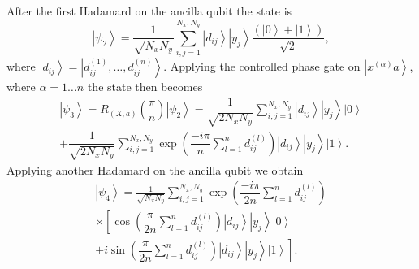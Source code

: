 \documentclass[pra,showkeys,twocolumn,showpacs,aps,10pt]{revtex4-1}
\begin{document}
After the first Hadamard on the ancilla qubit the state is
%
\begin{equation}
    \left| \psi_2 \right\rangle =
    \frac{1}{\sqrt{N_x N_y}}\sum\limits_{i, j=1}^{N_x,N_y}
    \left| d_{ij} \right\rangle
    \left| y_j \right\rangle
    \dfrac{(\left| 0 \right\rangle + \left| 1 \right\rangle)}{\sqrt{2}},
\end{equation}
%
where $\left| d_{ij} \right\rangle = \left| d_{ij}^{(1)},\ldots,d_{ij}^{(n)} \right\rangle$.
Applying the controlled phase gate on $\left| x^{(\alpha)} a \right\rangle$, where $\alpha = 1\dots n$  the state then becomes
%
\begin{multline}
    \left| \psi_3 \right\rangle = R_{(X,a)}\left(\dfrac{\pi}{n}\right)\left| \psi_2 \right\rangle
     = \dfrac{1}{\sqrt{2 N_x N_y}}
        \sum\limits_{i, j=1}^{N_x,N_y}
        \left| d_{ij} \right\rangle
        \left| y_j \right\rangle
        \left| 0 \right\rangle
        \\ + \dfrac{1}{\sqrt{2 N_x N_y}}
        \sum\limits_{i, j=1}^{N_x,N_y}
        \exp\left(\dfrac{-i \pi}{n}\sum\limits_{l=1}^n d^{(l)}_{ij} \right)
        \left| d_{ij} \right\rangle
        \left| y_j \right\rangle
        \left| 1 \right\rangle .
\end{multline}
%
Applying another Hadamard on the ancilla qubit we obtain
%
\begin{multline}
    \left| \psi_4 \right\rangle =
    \frac{1}{\sqrt{N_x N_y}}\sum\limits_{i, j=1}^{N_x,N_y}
    \exp \left(\dfrac{-i \pi}{2n}\sum\limits_{l=1}^n d^{(l)}_{ij} \right)
    \\ \times
        \left[ \cos\left(\dfrac{\pi}{2n}\sum\limits_{l=1}^n d^{(l)}_{ij} \right)
        \left| d_{ij} \right\rangle
        \left| y_j \right\rangle
        \left| 0 \right\rangle\right.
        \\+
        \left. i \sin\left(\dfrac{\pi}{2n}\sum\limits_{l=1}^n d^{(l)}_{ij} \right)
        \left| d_{ij} \right\rangle
        \left| y_j \right\rangle
        \left| 1 \right\rangle\right] .
\end{multline}
%
\end{document}
